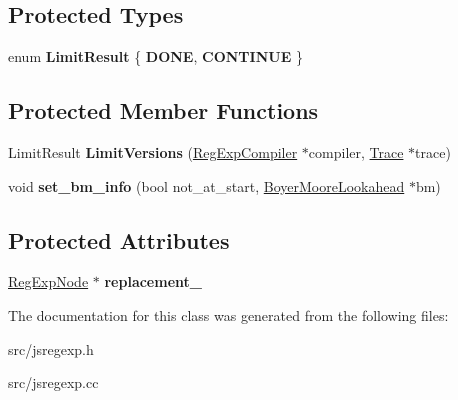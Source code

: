 \subsection*{Protected Types}
\begin{DoxyCompactItemize}
\item 
\hypertarget{classv8_1_1internal_1_1_reg_exp_node_a500fa4ebb18d4f45d6ea99e6da33defc}{}enum {\bfseries Limit\+Result} \{ {\bfseries D\+O\+N\+E}, 
{\bfseries C\+O\+N\+T\+I\+N\+U\+E}
 \}\label{classv8_1_1internal_1_1_reg_exp_node_a500fa4ebb18d4f45d6ea99e6da33defc}

\end{DoxyCompactItemize}
\subsection*{Protected Member Functions}
\begin{DoxyCompactItemize}
\item 
\hypertarget{classv8_1_1internal_1_1_reg_exp_node_a5b390ba923933075f890a385a6b1b5ee}{}Limit\+Result {\bfseries Limit\+Versions} (\hyperlink{classv8_1_1internal_1_1_reg_exp_compiler}{Reg\+Exp\+Compiler} $\ast$compiler, \hyperlink{classv8_1_1internal_1_1_trace}{Trace} $\ast$trace)\label{classv8_1_1internal_1_1_reg_exp_node_a5b390ba923933075f890a385a6b1b5ee}

\item 
\hypertarget{classv8_1_1internal_1_1_reg_exp_node_a1d97a915147648cff2a1792e2651547c}{}void {\bfseries set\+\_\+bm\+\_\+info} (bool not\+\_\+at\+\_\+start, \hyperlink{classv8_1_1internal_1_1_boyer_moore_lookahead}{Boyer\+Moore\+Lookahead} $\ast$bm)\label{classv8_1_1internal_1_1_reg_exp_node_a1d97a915147648cff2a1792e2651547c}

\end{DoxyCompactItemize}
\subsection*{Protected Attributes}
\begin{DoxyCompactItemize}
\item 
\hypertarget{classv8_1_1internal_1_1_reg_exp_node_aac19aaa0fa38bce51ee5b9977c9cf2c5}{}\hyperlink{classv8_1_1internal_1_1_reg_exp_node}{Reg\+Exp\+Node} $\ast$ {\bfseries replacement\+\_\+}\label{classv8_1_1internal_1_1_reg_exp_node_aac19aaa0fa38bce51ee5b9977c9cf2c5}

\end{DoxyCompactItemize}


The documentation for this class was generated from the following files\+:\begin{DoxyCompactItemize}
\item 
src/jsregexp.\+h\item 
src/jsregexp.\+cc\end{DoxyCompactItemize}

